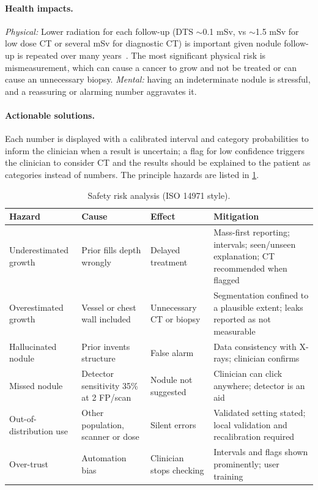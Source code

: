 \paragraph{Health impacts.} \emph{Physical:} Lower radiation for each follow-up (DTS $\sim$0.1 mSv, vs $\sim$1.5 mSv for low dose CT or several mSv for diagnostic CT) is important given nodule follow-up is repeated over many years~\cite{rampinelli2017,mascalchi2017}. The most significant physical risk is mismeasurement, which can cause a cancer to grow and not be treated or can cause an unnecessary biopsy. \emph{Mental:} having an indeterminate nodule is stressful, and a reassuring or alarming number aggravates it.

\paragraph{Actionable solutions.} Each number is displayed with a calibrated interval and category probabilities to inform the clinician when a result is uncertain; a flag for low confidence triggers the clinician to consider CT and the results should be explained to the patient as categories instead of numbers. The principle hazards are listed in \cref{tab:risk}.

\begin{table}[!htbp]
\centering\small
\caption{Safety risk analysis (ISO 14971 style).}
\label{tab:risk}
\begin{tabularx}{\linewidth}{>{\raggedright\arraybackslash}p{2.6cm} >{\raggedright\arraybackslash}p{2.9cm} >{\raggedright\arraybackslash}p{2.6cm} >{\raggedright\arraybackslash}X}
\toprule
Hazard & Cause & Effect & Mitigation \\
\midrule
Under\-estimated growth & Prior fills depth wrongly & Delayed treatment & Mass-first reporting; intervals; seen/unseen explanation; CT recommended when flagged \\
Overestimated growth & Vessel or chest wall included & Unnecessary CT or biopsy & Segmentation confined to a plausible extent; leaks reported as not measurable \\
Hallucinated nodule & Prior invents structure & False alarm & Data consistency with X-rays; clinician confirms \\
Missed nodule & Detector sensitivity 35\% at 2 FP/scan & Nodule not suggested & Clinician can click anywhere; detector is an aid \\
Out-of-distribution use & Other population, scanner or dose & Silent errors & Validated setting stated; local validation and recalibration required \\
Over-trust & Automation bias & Clinician stops checking & Intervals and flags shown prominently; user training \\
\bottomrule
\end{tabularx}
\end{table}

